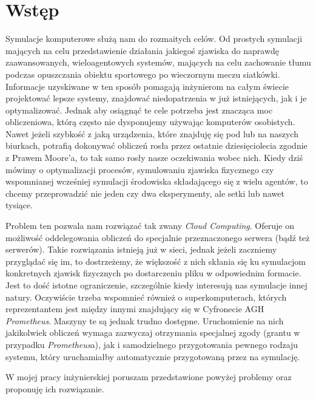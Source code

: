 \newcommand{\prometheusAgh}{\emph{Prometheus}}

\chapter{Wstęp}
\label{cha:wstep}
Symulacje komputerowe służą nam do rozmaitych celów. Od prostych symulacji mających na celu przedstawienie działania jakiegoś zjawiska do naprawdę zaawansowanych, wieloagentowych systemów, mających na celu zachowanie tłumu podczas opuszczania obiektu sportowego po wieczornym meczu siatkówki. Informacje uzyskiwane w ten sposób pomagają inżynierom na całym świecie projektować lepsze systemy, znajdować niedopatrzenia w już istniejących, jak i je optymalizować. Jednak aby osiągnąć te cele potrzeba jest znacząca moc obliczeniowa, którą często nie dysponujemy używając komputerów osobistych. Nawet jeżeli szybkość z jaką urządzenia, które znajduję się pod lub na naszych biurkach, potrafią dokonywać obliczeń rosła przez ostatnie dziesięciolecia zgodnie z Prawem Moore'a, to tak samo rosły nasze oczekiwania wobec nich. Kiedy dziś mówimy o optymalizacji procesów, symulowaniu zjawiska fizycznego czy wspomnianej wcześniej symulacji środowiska składającego się z wielu agentów, to chcemy przeprowadzić nie jeden czy dwa eksperymenty, ale setki lub nawet tysiące.
\par
Problem ten pozwala nam rozwiązać tak zwany \emph{Cloud Computing}. Oferuje on możliwość oddelegowania obliczeń do specjalnie przeznaczonego serwera (bądź też serwerów). Takie rozwiązania istnieją już w sieci, jednak jeżeli zaczniemy przyglądać się im, to dostrzeżemy, że większość z nich skłania się ku symulacjom konkretnych zjawisk fizycznych po dostarczeniu pliku w odpowiednim formacie. Jest to dość istotne ograniczenie, szczególnie kiedy interesują nas symulacje innej natury. Oczywiście trzeba wspomnieć również o superkomputerach, których reprezentantem jest między innymi znajdujący się w Cyfronecie AGH \prometheusAgh. Maszyny te są jednak trudno dostępne. Uruchomienie na nich jakikolwiek obliczeń wymaga zazwyczaj otrzymania specjalnej zgody (grantu w przypadku \prometheusAgh a), jak i samodzielnego przygotowania pewnego rodzaju systemu, który uruchamiałby automatycznie przygotowaną przez na symulację.
\par
W mojej pracy inżynierskiej poruszam przedstawione powyżej problemy oraz proponuję ich rozwiązanie.


